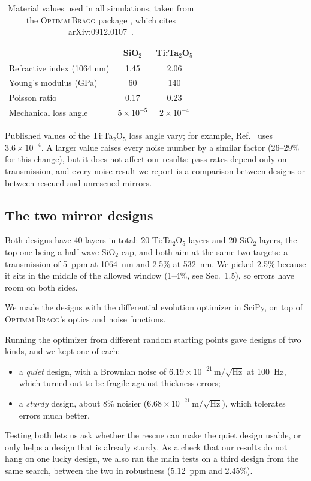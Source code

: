 \begin{table}[h]
\centering
\caption{Material values used in all simulations, taken from the
\textsc{OptimalBragg} package \cite{Venugopalan2024}, which cites
arXiv:0912.0107~\cite{MaterialsSource}.}
\label{tab:materials}
\begin{tabular}{lcc}
\hline
 & SiO$_2$ & Ti:Ta$_2$O$_5$ \\
\hline
Refractive index (1064 nm) & 1.45 & 2.06 \\
Young's modulus (GPa) & 60 & 140 \\
Poisson ratio & 0.17 & 0.23 \\
Mechanical loss angle & $5\times10^{-5}$ & $2\times10^{-4}$ \\
\hline
\end{tabular}
\end{table}

Published values of the Ti:Ta$_2$O$_5$ loss angle vary; for example,
Ref.~\cite{Venugopalan2024} uses $3.6\times10^{-4}$. A larger value
raises every noise number by a similar factor (26--29\% for this
change), but it does not affect our results: pass rates depend only on
transmission, and every noise result we report is a comparison between
designs or between rescued and unrescued mirrors.

\subsection{The two mirror designs}

Both designs have 40 layers in total: 20 Ti:Ta$_2$O$_5$ layers and 20
SiO$_2$ layers, the top one being a half-wave SiO$_2$ cap, and both aim at the same two targets: a transmission of 5~ppm at
1064~nm and 2.5\% at 532~nm. We picked 2.5\% because it sits in the
middle of the allowed window (1--4\%, see Sec.~1.5), so errors have
room on both sides.

We made the designs with the differential evolution optimizer in
SciPy, on top of \textsc{OptimalBragg}'s optics and noise functions.

Running the optimizer from different random starting points gave
designs of two kinds, and we kept one of each:
\begin{itemize}
\item a \emph{quiet} design, with a Brownian noise of
$6.19\times10^{-21}\,\mathrm{m}/\sqrt{\mathrm{Hz}}$ at 100~Hz, which
turned out to be fragile against thickness errors;
\item a \emph{sturdy} design, about 8\% noisier
($6.68\times10^{-21}\,\mathrm{m}/\sqrt{\mathrm{Hz}}$), which tolerates
errors much better.
\end{itemize}
Testing both lets us ask whether the rescue can make the quiet design
usable, or only helps a design that is already sturdy.
As a check that our results do not hang on one lucky design, we also ran
the main tests on a third design from the same search, between the two in
robustness (5.12~ppm and 2.45\%).

